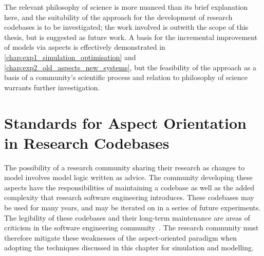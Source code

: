 The relevant philosophy of science is more nuanced than its brief explanation
here, and the suitability of the approach for the development of research
codebases is to be investigated; the work involved is outwith the scope of this
thesis, but is suggested as future work. A basis for the incremental improvement
of models via aspects is effectively demonstrated in
\cref{chap:exp1_simulation_optimisation} and
\cref{chap:exp2_old_aspects_new_systems}, but the feasibility of the approach as
a basis of a community's scientific process and relation to philosophy of
science warrants further investigation.


\section{Standards for Aspect Orientation in Research Codebases}
\label{future_work_standard_aosm_techniques}




The possibility of a research community sharing their research as
\aspectoriented{} changes to model involves model logic written as
advice. The community developing these aspects have the responsibilities of
maintaining a codebase as well as the added complexity that research software
engineering introduces. These codebases may be used for many years, and may be
iterated on in a series of future experiments. The legibility of these codebases
and their long-term maintenance are areas of criticism in the software
engineering
community~\cite{Constantinides04aopconsidered,steimann06paradoxical,przybylek2010wrong}.
The research community must therefore mitigate these weaknesses of the
aspect-oriented paradigm when adopting the techniques discussed in this chapter
for simulation and modelling.

